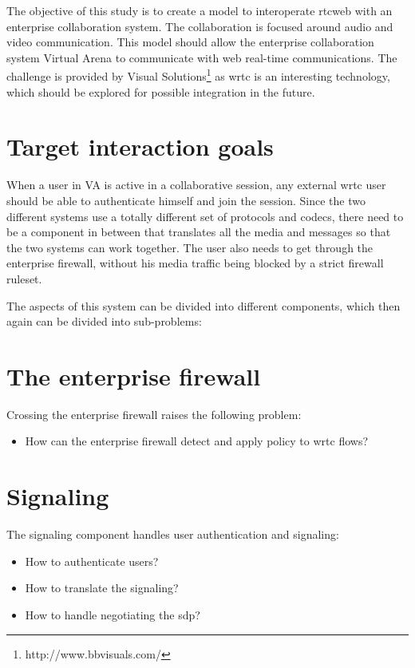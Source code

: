 
The objective of this study is to create a model to interoperate \gls{rtcweb} with an enterprise collaboration system. The collaboration is focused around audio and video communication. This model should allow the enterprise collaboration system Virtual Arena to communicate with web real-time communications. The challenge is provided by Visual Solutions\footnote{http://www.bbvisuals.com/} as \gls{wrtc} is an interesting technology, which should be explored for possible integration in the future.

\section{Target interaction goals}
When a user in VA is active in a collaborative session, any external \gls{wrtc} user should be able to authenticate himself and join the session. Since the two different systems use a totally different set of protocols and codecs, there need to be a component in between that translates all the media and messages so that the two systems can work together. The user also needs to get through the enterprise firewall, without his media traffic being blocked by a strict firewall ruleset.

The aspects of this system can be divided into different components, which then again can be divided into sub-problems:

\section{The enterprise firewall}
Crossing the enterprise firewall raises the following problem:
\begin{itemize}
\item{How can the enterprise firewall detect and apply policy to \gls{wrtc} flows?}
\end{itemize}

\section{Signaling}
The signaling component handles user authentication and signaling:
\begin{itemize}
\item{How to authenticate users?}
\item{How to translate the signaling?}
\item{How to handle negotiating the \gls{sdp}?}
\end{itemize}

